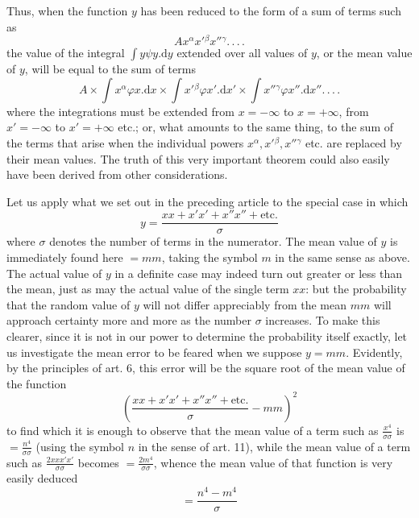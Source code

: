 Thus, when the function \(y\) has been reduced to the form of a sum of terms such as
\[
Ax^\alpha x'{}^\beta x''{}^\gamma\mathord{.}\,\mathord{.}\,\mathord{.}\,\mathord{.}
\]
the value of the integral \(\int y\psi y.\mathrm{d}y\) extended over all values of \(y\), or the mean value of \(y\), will be equal to the sum of terms
\[
A\times\int x^\alpha\varphi x.\mathrm{d}x\times\int x'{}^\beta\varphi x'.\mathrm{d}x'\times\int x''{}^\gamma\varphi x''.\mathrm{d}x''\mathord{.}\,\mathord{.}\,\mathord{.}\,\mathord{.}
\]
where the integrations must be extended from \(x=-\infty\) to \(x=+\infty\), from \(x'=-\infty\) to \(x'=+\infty\) etc.; or, what amounts to the same thing, to the sum of the terms that arise when the individual powers \(x^\alpha,x'{}^\beta,x''{}^\gamma\) etc. are replaced by their mean values. The truth of this very important theorem could also easily have been derived from other considerations.

Let us apply what we set out in the preceding article to the special case in which
\[
y=\frac{xx+x'x'+x''x''+\text{etc.}}{\sigma}
\]
where \(\sigma\) denotes the number of terms in the numerator. The mean value of \(y\) is immediately found here \(=mm\), taking the symbol \(m\) in the same sense as above. The actual value of \(y\) in a definite case may indeed turn out greater or less than the mean, just as may the actual value of the single term \(xx\): but the probability that the random value of \(y\) will not differ appreciably from the mean \(mm\) will approach certainty more and more as the number \(\sigma\) increases. To make this clearer, since it is not in our power to determine the probability itself exactly, let us investigate the mean error to be feared when we suppose \(y=mm\). Evidently, by the principles of art. 6, this error will be the square root of the mean value of the function
\[
\left(\frac{xx+x'x'+x''x''+\text{etc.}}{\sigma}-mm\right)^2
\]
to find which it is enough to observe that the mean value of a term such as \(\frac{x^4}{\sigma\sigma}\) is \(=\frac{n^4}{\sigma\sigma}\) (using the symbol \(n\) in the sense of art. 11), while the mean value of a term such as \(\frac{2xxx'x'}{\sigma\sigma}\) becomes \(=\frac{2m^4}{\sigma\sigma}\), whence the mean value of that function is very easily deduced
\[
=\frac{n^4-m^4}{\sigma}
\]

